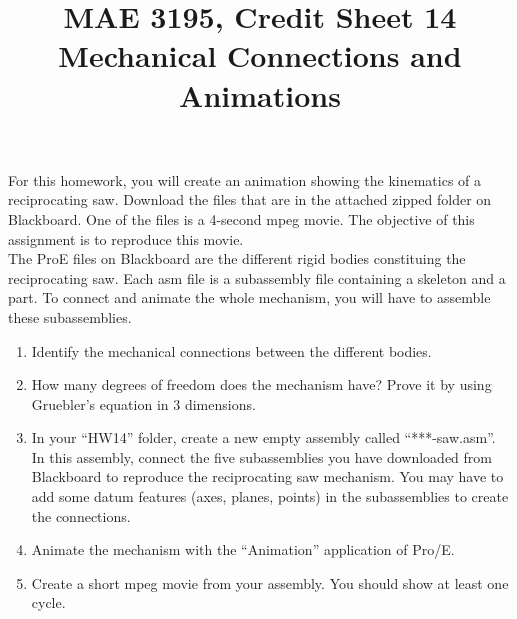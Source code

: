 \documentclass[12pt]{article}
\title{MAE 3195, Credit Sheet 14\\ Mechanical Connections and Animations}
\date{}
\begin{document}
\maketitle

For this homework, you will create an animation showing the kinematics of a reciprocating saw. Download the files that are in the attached zipped folder on Blackboard. One of the files is a 4-second mpeg movie. The objective of this assignment is to reproduce this movie.\\
The ProE files on Blackboard are the different rigid bodies constituing the reciprocating saw. Each asm file is a subassembly file containing a skeleton and a part. To connect and animate the whole mechanism, you will have to assemble these subassemblies.\\

\begin{enumerate}
	\item Identify the mechanical connections between the different bodies.
	\vspace{0.25in}
	\item How many degrees of freedom does the mechanism have? Prove it by using Gruebler's equation in 3 dimensions.
	\vspace{0.25in}
	\item In your ``HW14'' folder, create a new empty assembly called ``***-saw.asm''. In this assembly, connect the five subassemblies you have downloaded from Blackboard to reproduce the reciprocating saw mechanism. You may have to add some datum features (axes, planes, points) in the subassemblies to create the connections.
	\vspace{0.25in}
	\item Animate the mechanism with the ``Animation'' application of Pro/E.
	\vspace{0.25in}
	\item Create a short mpeg movie from your assembly. You should show at least one cycle. 
\end{enumerate}
\end{document}
